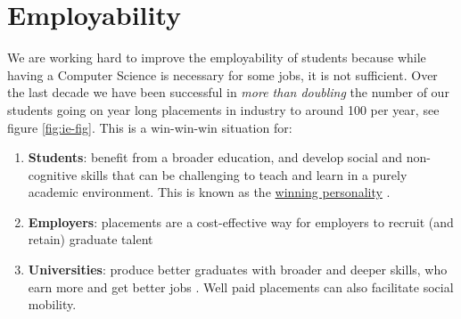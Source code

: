 \documentclass[
  12pt,
]{book}
\providecommand{\tightlist}{%
  \setlength{\itemsep}{0pt}\setlength{\parskip}{0pt}}
\begin{document}
\hypertarget{employability}{%
\section{Employability}\label{employability}}

We are working hard to improve the employability of students because while having a Computer Science is necessary for some jobs, it is not sufficient. \citep{unemployed, shadboltreview, fincherreview, finchergecco} Over the last decade we have been successful in \emph{more than doubling} the number of our students going on year long placements in industry to around 100 per year, see figure \ref{fig:ie-fig}. This is a win-win-win situation for:

\begin{enumerate}
\def\labelenumi{\arabic{enumi}.}
\tightlist
\item
  \textbf{Students}: benefit from a broader education, and develop social and non-cognitive skills that can be challenging to teach and learn in a purely academic environment. This is known as the \href{https://www.suttontrust.com/research-paper/a-winning-personality-confidence-aspirations-social-mobility/}{winning personality} \citep{winningpersonality}.
\item
  \textbf{Employers}: placements are a cost-effective way for employers to recruit (and retain) graduate talent
\item
  \textbf{Universities}: produce better graduates \citep{Mandilaras2004} with broader and deeper skills, who earn more and get better jobs \citep{winningpersonality}. Well paid placements can also facilitate social mobility. \citep{Wang2018}
\end{enumerate}
\end{document}
